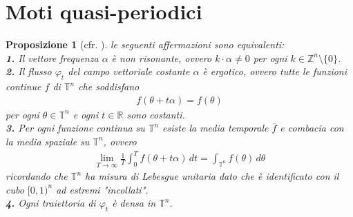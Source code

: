 \documentclass[twoside, 11pt]{amsbook}
\newcommand{\0}{{(0)}}
\newcommand{\3}{{(3)}}
\theoremstyle{colonplain}
\newtheorem{prop}[thm]{Proposizione}
\theoremstyle{colondefinition}
\theoremstyle{colonremark}
\numberwithin{equation}{chapter}
\begin{document}
\section{Moti quasi-periodici}
\begin{prop}[cfr. \cite{Fejoz01}] le seguenti affermazioni sono equivalenti: \\
\textbf{1.} Il vettore frequenza $\alpha$ è \textit{non risonante}, ovvero $k \cdot \alpha \neq 0$ per ogni $k \in \mathbb{Z}^n \setminus \{0\}$. \\
\textbf{2.} Il flusso $\varphi_t$ del campo vettoriale costante $\alpha$ è \textit{ergotico}, ovvero tutte le funzioni continue $f$ di $\mathbb{T}^n$ che soddisfano
\begin{align}
    f(\theta + t\alpha) = f(\theta)
\end{align}
per ogni $\theta \in \mathbb{T}^n$ e ogni $t \in \mathbb{R}$ sono costanti. \\
\textbf{3.} Per ogni funzione continua su $\mathbb{T}^n$ esiste la media temporale $\overline{f}$ e combacia con la media spaziale su $\mathbb{T}^n$, ovvero
\begin{align}\label{time/spaceMean}
    \lim_{T \rightarrow \infty}\frac{1}{T}\int_0^T f(\theta + t\alpha) \, dt = \int_{\mathbb{T}^n} f(\theta) \, d\theta
\end{align}
ricordando che $\mathbb{T}^n$ ha misura di Lebesgue unitaria dato che è identificato con il cubo $[0, 1)^n$ ad estremi "incollati". \\
\textbf{4.} Ogni traiettoria di $\varphi_t$ è densa in $\mathbb{T}^n$.
\end{prop}
\end{document}
